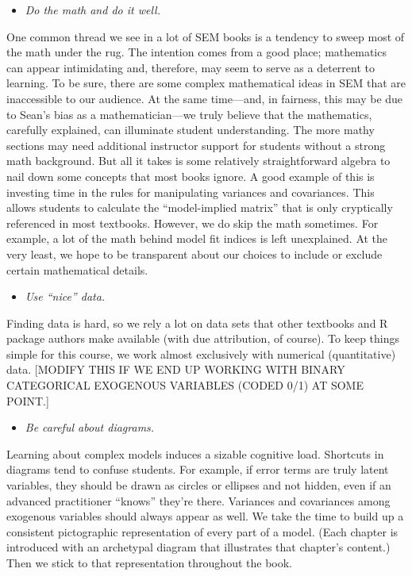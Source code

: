 \documentclass[
]{book}
\providecommand{\tightlist}{%
  \setlength{\itemsep}{0pt}\setlength{\parskip}{0pt}}
\begin{document}
\begin{itemize}
\tightlist
\item
  \emph{Do the math and do it well.}
\end{itemize}

One common thread we see in a lot of SEM books is a tendency to sweep most of the math under the rug. The intention comes from a good place; mathematics can appear intimidating and, therefore, may seem to serve as a deterrent to learning. To be sure, there are some complex mathematical ideas in SEM that are inaccessible to our audience. At the same time---and, in fairness, this may be due to Sean's bias as a mathematician---we truly believe that the mathematics, carefully explained, can illuminate student understanding. The more mathy sections may need additional instructor support for students without a strong math background. But all it takes is some relatively straightforward algebra to nail down some concepts that most books ignore. A good example of this is investing time in the rules for manipulating variances and covariances. This allows students to calculate the ``model-implied matrix'' that is only cryptically referenced in most textbooks. However, we do skip the math sometimes. For example, a lot of the math behind model fit indices is left unexplained. At the very least, we hope to be transparent about our choices to include or exclude certain mathematical details.

\begin{itemize}
\tightlist
\item
  \emph{Use ``nice'' data.}
\end{itemize}

Finding data is hard, so we rely a lot on data sets that other textbooks and R package authors make available (with due attribution, of course). To keep things simple for this course, we work almost exclusively with numerical (quantitative) data. {[}MODIFY THIS IF WE END UP WORKING WITH BINARY CATEGORICAL EXOGENOUS VARIABLES (CODED 0/1) AT SOME POINT.{]}

\begin{itemize}
\tightlist
\item
  \emph{Be careful about diagrams.}
\end{itemize}

Learning about complex models induces a sizable cognitive load. Shortcuts in diagrams tend to confuse students. For example, if error terms are truly latent variables, they should be drawn as circles or ellipses and not hidden, even if an advanced practitioner ``knows'' they're there. Variances and covariances among exogenous variables should always appear as well. We take the time to build up a consistent pictographic representation of every part of a model. (Each chapter is introduced with an archetypal diagram that illustrates that chapter's content.) Then we stick to that representation throughout the book.
\end{document}
